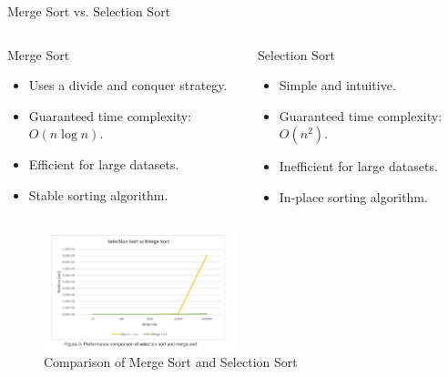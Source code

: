 \documentclass{beamer}
\begin{document}
\begin{frame}{Merge Sort vs. Selection Sort}
  \begin{columns}
    \begin{block}{Merge Sort}
      \begin{itemize}
        \item Uses a divide and conquer strategy.
        \item Guaranteed time complexity: \(O(n \log n)\).
        \item Efficient for large datasets.
        \item Stable sorting algorithm.
      \end{itemize}
    \end{block}

    \begin{block}{Selection Sort}
      \begin{itemize}
        \item Simple and intuitive.
        \item Guaranteed time complexity: \(O(n^2)\).
        \item Inefficient for large datasets.
        \item In-place sorting algorithm.
      \end{itemize}
    \end{block}
  \end{columns}

  \vspace{1em}

  \begin{figure}
    \centering
    \includegraphics[width=0.5\textwidth]{graphics/sm.jpeg}
    \caption{Comparison of Merge Sort and Selection Sort}
  \end{figure}
\end{frame}
\end{document}
